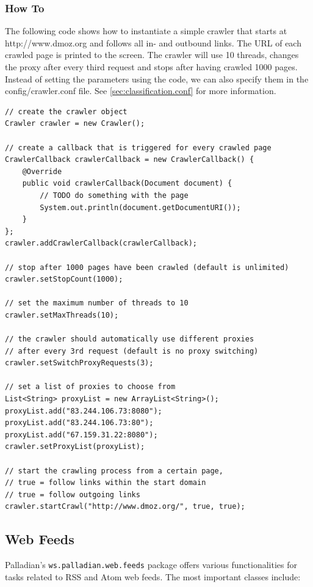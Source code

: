 \documentclass[a4paper,twoside]{book}      %
\begin{document}
\subsubsection{How To}
The following code shows how to instantiate a simple crawler that starts at http://www.dmoz.org and follows all in- and outbound links. The URL of each crawled page is printed to the screen. The crawler will use 10 threads, changes the proxy after every third request and stops after having crawled 1000 pages. Instead of setting the parameters using the code, we can also specify them in the config/crawler.conf file. See \ref{sec:classification.conf} for more information.

\begin{codelisting}
\begin{lstlisting}[caption=Using the web crawler.,frame=tb]
// create the crawler object
Crawler crawler = new Crawler();

// create a callback that is triggered for every crawled page
CrawlerCallback crawlerCallback = new CrawlerCallback() {
	@Override
	public void crawlerCallback(Document document) {
		// TODO do something with the page
		System.out.println(document.getDocumentURI());
	}
};
crawler.addCrawlerCallback(crawlerCallback);

// stop after 1000 pages have been crawled (default is unlimited)
crawler.setStopCount(1000);

// set the maximum number of threads to 10
crawler.setMaxThreads(10);

// the crawler should automatically use different proxies
// after every 3rd request (default is no proxy switching)
crawler.setSwitchProxyRequests(3);

// set a list of proxies to choose from
List<String> proxyList = new ArrayList<String>();
proxyList.add("83.244.106.73:8080");
proxyList.add("83.244.106.73:80");
proxyList.add("67.159.31.22:8080");
crawler.setProxyList(proxyList);

// start the crawling process from a certain page,
// true = follow links within the start domain
// true = follow outgoing links
crawler.startCrawl("http://www.dmoz.org/", true, true);
\end{lstlisting}
\end{codelisting}

\subsection{Web Feeds}
Palladian's \texttt{ws.palladian.web.feeds} package offers various functionalities for tasks related to RSS and Atom web feeds. The most important classes include:
\end{document}
